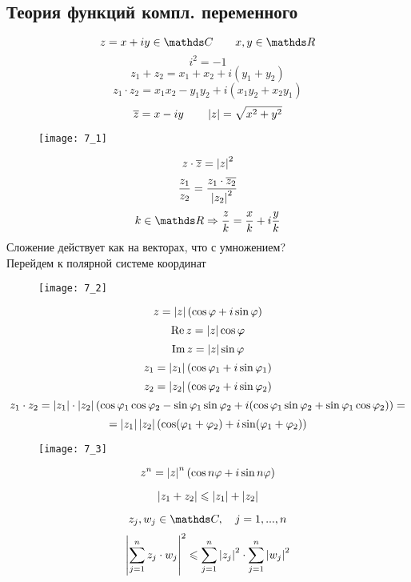 \documentclass[main]{subfiles}
\begin{document}
\begin{lect}
		\section{Теория функций компл. переменного}
		\begin{Reminder}
		    \[z = x + iy \in \CC \qq x, y \in \R\]
				\[i^2 = -1\]
				\[z_1 + z_2 = x_1 + x_2 + i(y_1 + y_2)\]
				\[z_1 \cdot z_2 = x_1 x_2 - y_1 y_2 + i(x_1 y_2  + x_2 y_1)\]
				\[\overline{z} = x - iy \qquad \left|z\right| = \sqrt{x^2 + y^2}\]
	      \begin{figure}[H]
	        \centering
	        \texttt{[image: 7\_1]}
	      \end{figure}
				\[z \cdot \overline{z} = \left|z\right|^2\]
				\[\frac{z_1}{z_2} = \frac{z_1 \cdot \overline{z_2}}{\left|z_2\right|^2}\]
				\[k \in \R \Ra \frac{z}{k} = \frac{x}{k} + i \frac{y}{k}\]
				Сложение действует как на векторах, что с умножением?\\
				Перейдем к полярной системе координат
	      \begin{figure}[H]
	        \centering
	        \texttt{[image: 7\_2]}
	      \end{figure}
				\[z = \left|z\right| (\cos \varphi + i \sin \varphi)\]
				\[\mathop{\rm Re}\nolimits z = \left|z\right| \cos \varphi\]
				\[\mathop{\rm Im}\nolimits z = \left|z\right| \sin \varphi\]
				\[z_1 = \left|z_1\right| (\cos \varphi_1 + i \sin \varphi_1)\]
				\[z_2 = \left|z_2\right| (\cos \varphi_2 + i \sin \varphi_2)\]
				\[z_1 \cdot z_2 = \left|z_1\right| \cdot \left|z_2\right|
				(\cos \varphi_1 \cos \varphi_2 - \sin \varphi_1 \sin \varphi_2
			    +i(\cos \varphi_1 \sin \varphi_2 + \sin \varphi_1 \cos \varphi_2)) = \]
				\[ = \left|z_1\right| \left|z_2\right| (\cos(\varphi_1 + \varphi_2) +
				i \sin (\varphi_1 + \varphi_2))\]
	      \begin{figure}[H]
	        \centering
	        \texttt{[image: 7\_3]}
	      \end{figure}
		\end{Reminder}

		\begin{Theorem} [Ф-ла Муавра]
				\[z^n = \left|z\right|^n (\cos{n \varphi} + i \sin n \varphi )\]
		\end{Theorem}

		\begin{Definition} [н-во \bigtriangleup]
				\[\left|z_1 + z_2\right| \leqslant \left|z_1\right| + \left|z_2\right|\]
		\end{Definition}

		\begin{Definition} [н-во Коши]
		    \[z_j, w_j \in \CC, \q j = 1, ..., n\]
				\[\left|\sum_{j = 1}^n z_j \cdot w_j\right|^2 \leqslant \sum_{j = 1}^n
				\left|z_j\right|^2 \cdot \sum_{j = 1}^n \left|w_j\right|^2 \]
		\end{Definition}


\end{lect}
\end{document}
